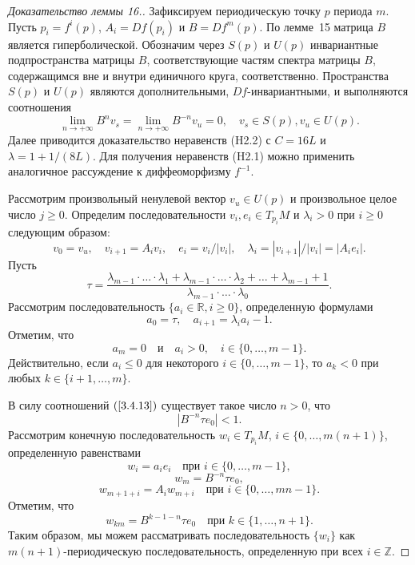 \documentclass[12pt]{article}
\begin{document}
\begin{proof}[Доказательство леммы 16.]
Зафиксируем периодическую точку $p$ периода $m$.
Пусть $p_i=f^i(p)$, $A_i=Df(p_i)$ и $B=Df^m(p)$. По лемме~15 матрица $B$ является гиперболической. Обозначим через $S(p)$ и $U(p)$ инвариантные подпространства матрицы $B$, соответствующие частям спектра матрицы $B$, содержащимся вне и внутри единичного круга, соответственно. Пространства $S(p)$ и $U(p)$ являются дополнительными, $Df$-инвариантными, и выполняются соотношения
\begin{equation}
\label{3.4.13}
\lim_{n\rightarrow+\infty}B^nv_s=\lim_{n\rightarrow+\infty}B^{-n}v_u=0,\quad v_s\in S(p), v_u\in U(p).
\end{equation} 
Далее приводится доказательство неравенств (H2.2) с $C=16L$ и $\lambda=1+1/(8L)$. Для получения неравенств (H2.1) можно применить аналогичное рассуждение к диффеоморфизму $f^{-1}$.

Рассмотрим произвольный ненулевой вектор $v_u\in U(p)$ и произвольное целое число $j\geq0$. Определим последовательности $v_i,e_i\in T_{p_i}M$ и $\lambda_i>0$ при $i\geq0$ следующим образом:
$$v_0=v_u,\quad v_{i+1}=A_iv_i,\quad e_i=v_i/|v_i|,\quad\lambda_i=|v_{i+1}|/|v_i|=|A_ie_i|.$$
Пусть
$$\tau=\frac{\lambda_{m-1}\cdot\ldots\cdot\lambda_1+\lambda_{m-1}\cdot\ldots\cdot\lambda_2+\ldots+\lambda_{m-1}+1}{\lambda_{m-1}\cdot\ldots\cdot\lambda_0}.$$
Рассмотрим последовательность $\{a_i\in\mathbb{R},i\geq0\}$, определенную формулами
\begin{equation}
\label{3.4.14}
a_0=\tau,\quad a_{i+1}=\lambda_ia_i-1.
\end{equation}
Отметим, что
\begin{equation}
\label{3.4.15}
a_m=0\quad\mbox{и}\quad a_i>0,\quad i\in\{0,\ldots,m-1\}.
\end{equation}
Действительно, если $a_i\leq0$ для некоторого $i\in\{0,\ldots,m-1\}$, то $a_k<0$ при любых $k\in\{i+1,\ldots,m\}$.

В силу соотношений $(\ref{3.4.13})$ существует такое число $n>0$, что 
\begin{equation}
\label{3.4.16}
|B^{-n}\tau e_0|<1.
\end{equation}
Рассмотрим конечную последовательность $w_i\in T_{p_i}M$, $i\in\{0,\ldots,\allowbreak m(n+1)\}$, определенную равенствами
$$w_i=a_ie_i\quad\textrm{при } i\in\{0,\ldots,m-1\},$$
$$w_m=B^{-n}\tau e_0,$$
$$w_{m+1+i}=A_iw_{m+i}\quad\textrm{при } i\in\{0,\ldots,mn-1\}.$$
Отметим, что
$$w_{km}=B^{k-1-n}\tau e_0\quad\textrm{при } k\in\{1,\ldots,n+1\}.$$
Таким образом, мы можем рассматривать последовательность $\{w_i\}$ как $m(n+1)$-периодическую последовательность, определенную при всех $i\in\mathbb{Z}$.


\end{proof}
\end{document}
